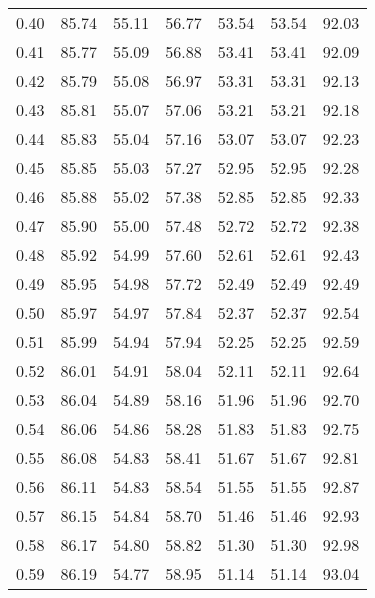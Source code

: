 \begin{tabular}{|c|c|c|c|c|c|c|}
      0.40 &     85.74 &     55.11 &      56.77 &   53.54 &      53.54 &         92.03 \\
      0.41 &     85.77 &     55.09 &      56.88 &   53.41 &      53.41 &         92.09 \\
      0.42 &     85.79 &     55.08 &      56.97 &   53.31 &      53.31 &         92.13 \\
      0.43 &     85.81 &     55.07 &      57.06 &   53.21 &      53.21 &         92.18 \\
      0.44 &     85.83 &     55.04 &      57.16 &   53.07 &      53.07 &         92.23 \\
      0.45 &     85.85 &     55.03 &      57.27 &   52.95 &      52.95 &         92.28 \\
      0.46 &     85.88 &     55.02 &      57.38 &   52.85 &      52.85 &         92.33 \\
      0.47 &     85.90 &     55.00 &      57.48 &   52.72 &      52.72 &         92.38 \\
      0.48 &     85.92 &     54.99 &      57.60 &   52.61 &      52.61 &         92.43 \\
      0.49 &     85.95 &     54.98 &      57.72 &   52.49 &      52.49 &         92.49 \\
      0.50 &     85.97 &     54.97 &      57.84 &   52.37 &      52.37 &         92.54 \\
      0.51 &     85.99 &     54.94 &      57.94 &   52.25 &      52.25 &         92.59 \\
      0.52 &     86.01 &     54.91 &      58.04 &   52.11 &      52.11 &         92.64 \\
      0.53 &     86.04 &     54.89 &      58.16 &   51.96 &      51.96 &         92.70 \\
      0.54 &     86.06 &     54.86 &      58.28 &   51.83 &      51.83 &         92.75 \\
      0.55 &     86.08 &     54.83 &      58.41 &   51.67 &      51.67 &         92.81 \\
      0.56 &     86.11 &     54.83 &      58.54 &   51.55 &      51.55 &         92.87 \\
      0.57 &     86.15 &     54.84 &      58.70 &   51.46 &      51.46 &         92.93 \\
      0.58 &     86.17 &     54.80 &      58.82 &   51.30 &      51.30 &         92.98 \\
      0.59 &     86.19 &     54.77 &      58.95 &   51.14 &      51.14 &         93.04 \\

\end{tabular}
